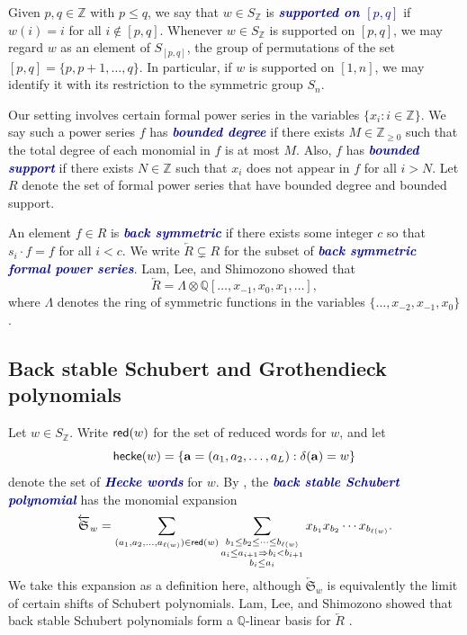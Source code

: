 \documentclass[12 pt]{amsart}
\newcommand{\newword}[1]{\textcolor{darkblue}{\textbf{\emph{#1}}}}
\newcommand{\redword}{{\sf red}}
\newcommand{\heckeword}{{\sf hecke}}
\numberwithin{equation}{section}
\theoremstyle{remark}
\newcommand{\demprod}{\delta}
\begin{document}
		Given $p, q \in \mathbb{Z}$ with $p \leq q$, we say that $w\in S_{\mathbb{Z}}$ is \newword{supported on $[p,q]$} if $w(i) = i$ for all $i\notin [p,q]$. 
		Whenever $w \in S_{\mathbb{Z}}$ is supported on $[p,q]$, we may regard $w$ as an element of $S_{[p,q]}$, the group of permutations of the set $[p,q] = \{p,p + 1,\ldots,q\}$. 
		In particular, if $w$ is supported on $[1,n]$, we may identify it with its restriction to the symmetric group $S_n$.
		
		Our setting involves certain formal power series in the variables $\{x_i : i \in \mathbb{Z}\}$. 
		We say
		such a power series $f$ has \newword{bounded degree} if there exists $M \in \mathbb{Z}_{\geq 0}$ such that the total degree of each monomial in $f$ is at most $M$. 
		Also, $f$ has \newword{bounded support} if there exists $N \in \mathbb{Z}$ such that $x_i$ does not appear in $f$ for all $i > N$.
		Let $R$ denote the set of formal power series that have bounded degree and bounded support.
		
		
		An element $f \in R$ is \newword{back symmetric} if there exists some integer $c$ so that $s_i \cdot f = f$ for all $i < c$. 
		We write $\overleftarrow{R} \subsetneq R$ for the subset of \newword{back symmetric formal power series}.
		Lam, Lee, and Shimozono showed that 
		\[\overleftarrow{R} = \Lambda \otimes \mathbb Q[\ldots, x_{-1}, x_0, x_1,\ldots],\] where $\Lambda$ denotes the ring of symmetric functions in the variables $\{\ldots, x_{-2}, x_{-1}, x_0\}$ \cite[Proposition 3.1]{Lam.Lee.Shimozono}. 
				
		\subsection{Back stable Schubert and Grothendieck polynomials}
		
		Let $w \in S_{\mathbb{Z}}$. 
		Write $\redword(w)$ for the set of reduced words for $w$, and let 
		\[\heckeword(w) = \{\mathbf{a} = (a_1,a_2,\ldots,a_L):\demprod(\mathbf{a}) = w\}\] 
		denote the set of \newword{Hecke words} for $w$. 
		By \cite[Theorem 3.2]{Lam.Lee.Shimozono}, the \newword{back stable Schubert polynomial} has the monomial expansion
		\begin{equation}
			\label{eqn:backschubertcompat}
			\overleftarrow{\mathfrak{S}}_w = \sum_{(a_1,a_2,\ldots,a_{\ell(w)}) \in\redword(w)}
			\sum_{\substack{b_1\leq b_2\leq \cdots \leq b_{\ell(w)}\\
					a_i\leq a_{i + 1} \Rightarrow b_i < b_{i + 1}\\
					b_i\leq a_i}
			} 
		x_{b_1} x_{b_2} \cdots x_{b_{\ell(w)}}.
		\end{equation}
		We take this expansion as a definition here, although $\overleftarrow{\mathfrak{S}}_w$ is equivalently the limit of certain shifts of Schubert polynomials. 
		Lam, Lee, and Shimozono showed that back stable Schubert polynomials form a $\mathbb{Q}$-linear basis for $\overleftarrow{R}$ \cite[Theorem~3.5]{Lam.Lee.Shimozono}.
		
\end{document}
